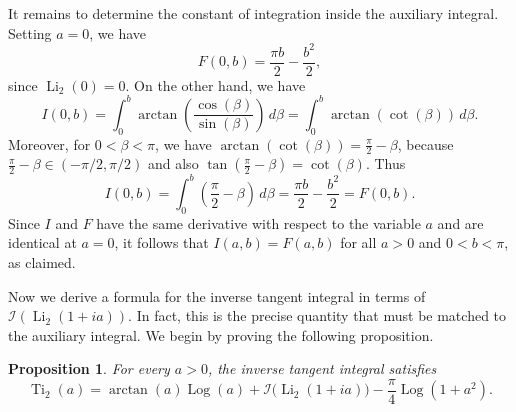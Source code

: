 \documentclass[preprint,12pt,nopreprintline]{elsarticle}
\begin{document}
It remains to determine the constant of integration inside the auxiliary integral. Setting \(a=0\), we have
\begin{equation}
F(0,b)=\frac{\pi b}{2}-\frac{b^2}{2},
\end{equation}
since \(\operatorname{Li}_2(0)=0\). On the other hand, we have
\begin{equation}
I(0,b)
=
\int_0^b \arctan\!\left(\frac{\cos\left(\beta\right)}{\sin\left(\beta\right)}\right)\,d\beta
=
\int_0^b \arctan(\cot\left(\beta\right))\,d\beta.
\end{equation}
Moreover, for \(0<\beta<\pi\), we have \(\arctan(\cot\left(\beta\right))=\frac{\pi}{2}-\beta\), because \(\frac{\pi}{2}-\beta\in(-\pi/2,\pi/2)\) and also \(\tan\!\left(\frac{\pi}{2}-\beta\right)=\cot\left(\beta\right)\). Thus
\[
I(0,b)
=
\int_0^b \left(\frac{\pi}{2}-\beta\right)\,d\beta
=
\frac{\pi b}{2}-\frac{b^2}{2}
=
F(0,b).
\]
Since \(I\) and \(F\) have the same derivative with respect to the variable \(a\) and are identical at \(a=0\), it follows that \(I(a,b)=F(a,b)\) for all \(a>0\) and \(0<b<\pi\), as claimed.

Now we derive a formula for the inverse tangent integral in terms of
\(\mathscr{I}(\operatorname{Li}_2(1+ia))\). In fact, this is the precise quantity that must be matched to the auxiliary
integral. We begin by proving the following proposition.

\newtheorem{prop}{Proposition}
\begin{prop}
\label{my.prop}
For every \(a>0\), the inverse tangent integral satisfies
\begin{equation}
\operatorname{Ti}_2(a)
=
\arctan(a)\operatorname{Log}(a)
+
\mathscr{I}\!\bigl(\operatorname{Li}_2(1+ia)\bigr)
-\frac{\pi}{4}\operatorname{Log}(1+a^2).
\end{equation}
\end{prop}
\end{document}
